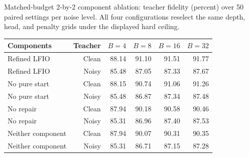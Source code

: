 \begin{kbtable}
\centering
\caption{Matched-budget 2-by-2 component ablation: teacher fidelity (percent) over 50 paired settings per noise level. All four configurations reselect the same depth, head, and penalty grids under the displayed hard ceiling.}
\label{tab:strength_ablation}
\small
\begin{adjustbox}{max width=\linewidth}
\begin{tabular}{lrrrrr}
\toprule
Components & Teacher & $B=4$ & $B=8$ & $B=16$ & $B=32$ \\
\midrule
Refined LFIO & Clean & 88.14 & 91.10 & 91.51 & 91.77 \\
Refined LFIO & Noisy & 85.48 & 87.05 & 87.33 & 87.67 \\
No pure start & Clean & 88.15 & 90.74 & 91.06 & 91.26 \\
No pure start & Noisy & 85.48 & 86.87 & 87.34 & 87.48 \\
No repair & Clean & 87.94 & 90.18 & 90.58 & 90.46 \\
No repair & Noisy & 85.31 & 86.96 & 87.40 & 87.53 \\
Neither component & Clean & 87.94 & 90.07 & 90.31 & 90.35 \\
Neither component & Noisy & 85.31 & 86.71 & 87.15 & 87.28 \\
\bottomrule
\end{tabular}
\end{adjustbox}
\end{kbtable}
